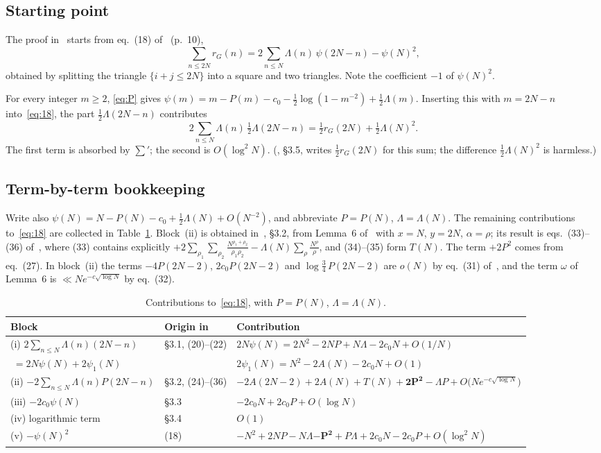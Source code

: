 \documentclass[11pt]{amsart}
\theoremstyle{definition}
\theoremstyle{remark}
\numberwithin{equation}{section}
\newcommand{\rG}{r_G}
\newcommand{\Ca}{\cite{Ca}}
\begin{document}
\subsection{Starting point}
The proof in~\Ca{} starts from eq.~(18) of~\Ca{} (p.~10),
\begin{equation}\label{eq:18}
  \sum_{n\le2N}\rG(n)=2\sum_{n\le N}\Lambda(n)\,\psi(2N-n)-\psi(N)^2 ,
\end{equation}
obtained by splitting the triangle $\{i+j\le 2N\}$ into a square and two triangles. Note
the coefficient $-1$ of $\psi(N)^2$.

For every integer $m\ge2$, \eqref{eq:P} gives
$\psi(m)=m-P(m)-c_0-\frac12\log(1-m^{-2})+\frac12\Lambda(m)$. Inserting this with
$m=2N-n$ into~\eqref{eq:18}, the part $\frac12\Lambda(2N-n)$ contributes
\[
  2\sum_{n\le N}\Lambda(n)\,\tfrac12\Lambda(2N-n)=\tfrac12\rG(2N)+\tfrac12\Lambda(N)^2 .
\]
The first term is absorbed by $\sum'$; the second is $O(\log^2N)$. (\Ca{}, §3.5, writes
$\frac12\rG(2N)$ for this sum; the difference $\frac12\Lambda(N)^2$ is harmless.)

\subsection{Term-by-term bookkeeping}
Write also $\psi(N)=N-P(N)-c_0+\frac12\Lambda(N)+O(N^{-2})$, and abbreviate $P=P(N)$,
$\Lambda=\Lambda(N)$. The remaining contributions to~\eqref{eq:18} are collected in
Table~\ref{tab:blocks}. Block~(ii) is obtained in~\Ca{}, §3.2, from Lemma~6 of~\Ca{} with
$x=N$, $y=2N$, $\alpha=\rho$; its result is eqs.~(33)--(36) of~\Ca{}, where (33)
contains explicitly
$+2\sum_{\rho_1}\sum_{\rho_2}\frac{N^{\rho_1+\rho_2}}{\rho_1\rho_2}-\Lambda(N)\sum_\rho\frac{N^\rho}{\rho}$,
and (34)--(35) form $T(N)$. The term $+2P^2$ comes from eq.~(27). In block~(ii) the terms
$-4P(2N-2)$, $2c_0P(2N-2)$ and $\log\frac34\,P(2N-2)$ are $o(N)$ by eq.~(31) of~\Ca{},
and the term $\omega$ of Lemma~6 is $\ll N e^{-c\sqrt{\log N}}$ by eq.~(32).

\begin{table}[H]
\centering
\small
\caption{Contributions to~\eqref{eq:18}, with $P=P(N)$, $\Lambda=\Lambda(N)$.}
\label{tab:blocks}
\begin{tabular}{@{}lll@{}}
\toprule
Block & Origin in \Ca{} & Contribution \\
\midrule
(i) $2\sum_{n\le N}\Lambda(n)(2N-n)$ & §3.1, (20)--(22) & $2N\psi(N)=2N^2-2NP+N\Lambda-2c_0N+O(1/N)$\\
 $\;=2N\psi(N)+2\psi_1(N)$ & & $2\psi_1(N)=N^2-2A(N)-2c_0N+O(1)$\\[2pt]
(ii) $-2\sum_{n\le N}\Lambda(n)P(2N-n)$ & §3.2, (24)--(36) &
 $-2A(2N-2)+2A(N)+T(N)+\mathbf{2P^2}-\Lambda P+O\bigl(Ne^{-c\sqrt{\log N}}\bigr)$\\[2pt]
(iii) $-2c_0\psi(N)$ & §3.3 & $-2c_0N+2c_0P+O(\log N)$\\[2pt]
(iv) logarithmic term & §3.4 & $O(1)$\\[2pt]
(v) $-\psi(N)^2$ & (18) & $-N^2+2NP-N\Lambda\mathbf{-P^2}+P\Lambda+2c_0N-2c_0P+O(\log^2N)$\\
\bottomrule
\end{tabular}
\end{table}
\end{document}
